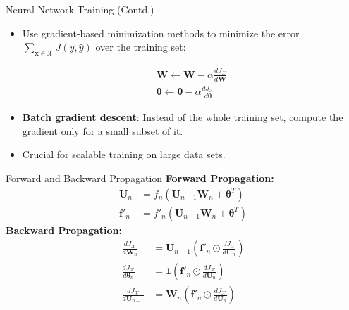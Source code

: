\documentclass{beamer}
\begin{document}
\begin{frame}{Neural Network Training (Contd.)}
  \begin{itemize}
    \item Use gradient-based minimization methods to minimize
      the error $\sum_{\mathbf{x} \in \mathcal{X}}J(y,\hat{y})$ over the training set:

      \begin{align}
        \mathbf{W} \leftarrow \mathbf{W} - \alpha \frac{dJ_\mathcal{X}}{d\mathbf{W}} \\
        \boldsymbol{\theta} \leftarrow \boldsymbol{\theta} - \alpha 
\frac{d J_\mathcal{X}}{d\boldsymbol{\theta}}
        \end{align}
   \item \textbf{Batch gradient descent}: Instead of the whole training set,
     compute the gradient only for a small subset of it.
   \item Crucial for scalable training on large data sets.

 \end{itemize}
\end{frame}

\begin{frame}{Forward and Backward Propagation}
  \textbf{Forward Propagation:}
    \begin{align}
      \mathbf{U}_n &= f_n\left ( \mathbf{U}_{n-1} \mathbf{W}_n
                              + \boldsymbol{\theta}^T \right) \\
              \mathbf{f}'_n &= f'_n\left ( \mathbf{U}_{n-1} \mathbf{W}_n
                              + \boldsymbol{\theta}^T \right) 
      \end{align}
 \textbf{Backward Propagation:}
    \begin{align}
      \frac{dJ_\mathcal{X}}{d\mathbf{W}_n} &=  \mathbf{U}_{n-1} \left(\mathbf{f}'_n \odot 
           \frac{dJ_\mathcal{X}}{d\mathbf{U}_n} \right)  \\
      \frac{dJ_\mathcal{X}}{d\boldsymbol{\theta}_n} &=  \mathbf{1} \left(\mathbf{f}'_n \odot 
           \frac{dJ_\mathcal{X}}{d\mathbf{U}_n} \right) \\
      \frac{dJ_\mathcal{X}}{d\mathbf{U}_{n-1}} &=  \mathbf{W}_n \left(\mathbf{f}'_n \odot 
           \frac{dJ_\mathcal{X}}{d\mathbf{U}_n} \right)
      \end{align}
\end{frame}
\end{document}
